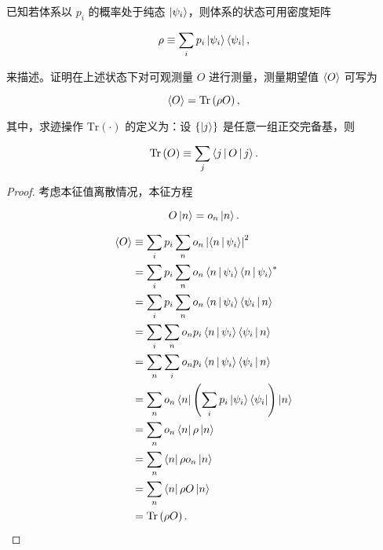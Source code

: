 \begin{example}

已知若体系以 $p_i $ 的概率处于纯态 $\Ket{\psi_i } $，则体系的状态可用密度矩阵

\begin{equation}
\rho
\equiv \sum_i p_i \Ket{\psi_i }\Bra{\psi_i},
\end{equation}

来描述。证明在上述状态下对可观测量 $O $ 进行测量，测量期望值 $\Braket{O} $ 可写为

\begin{equation}
\Braket{O}
=\mathrm{Tr}\left(\rho O \right),
\end{equation}

其中，求迹操作 $\mathrm{Tr}(\cdot) $ 的定义为：设 $\left\{\Ket{j } \right\} $ 是任意一组正交完备基，则

\begin{equation}
\mathrm{Tr}\left(O \right)
\equiv \sum_{j} \Braket{j | O | j}.
\end{equation}

\end{example}

\begin{proof}

考虑本征值离散情况，本征方程

\begin{equation}
O \Ket{n } = o_n \Ket{n }.
\end{equation}

\begin{equation}
\begin{split}
\Braket{O}
&\equiv \sum_i p_i \sum_n o_n \left|\Braket{n | \psi_i } \right|^2 \\
&=\sum_i p_i \sum_n o_n \Braket{n | \psi_i } \Braket{n | \psi_i }^* \\
&=\sum_i p_i \sum_n o_n \Braket{n | \psi_i } \Braket{\psi_i | n } \\
&=\sum_i \sum_n o_n p_i \Braket{n | \psi_i } \Braket{\psi_i | n } \\
&=\sum_n \sum_i o_n p_i \Braket{n | \psi_i } \Braket{\psi_i | n } \\
&=\sum_n o_n \Bra{n} \left(\sum_i p_i \Ket{\psi_i }\Bra{\psi_i} \right) \Ket{n } \\
&=\sum_n o_n \Bra{n} \rho \Ket{n } \\
&=\sum_n \Bra{n} \rho o_n \Ket{n } \\
&=\sum_n \Bra{n} \rho O \Ket{n } \\
&=\mathrm{Tr}\left(\rho O \right).
\end{split}
\end{equation}

\end{proof}

